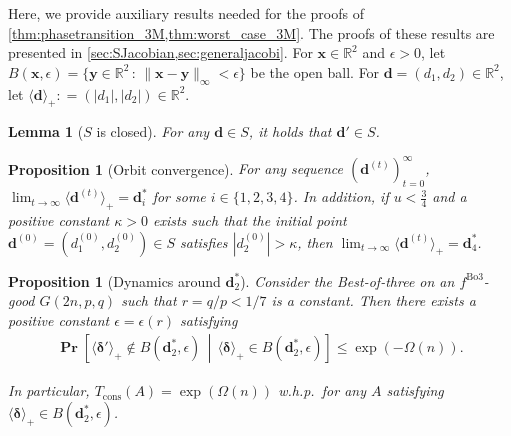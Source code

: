 \documentclass[letterpaper,11pt]{article}
\newtheorem{lemma}[theorem]{Lemma}
\newtheorem{proposition}[theorem]{Proposition}
\newcommand{\Tcons}{T_{\mathrm{cons}}}
\newcommand{\Bthree}{\mathrm{Bo3}}
\newcommand*{\absp}[1]{\langle #1 \rangle_+}
\renewcommand\Pr{\mathop{\mathbf{Pr}}}
\def\defeq{\mathrel{\mathop:}=}%
\begin{document}
Here, we provide auxiliary results needed for the proofs of \cref{thm:phasetransition_3M,thm:worst_case_3M}.
The proofs of these results are presented in \cref{sec:SJacobian,sec:generaljacobi}. %
For $\mathbf{x}\in\mathbb{R}^2$ and $\epsilon>0$, let $B(\mathbf{x},\epsilon)=\{\mathbf{y}\in\mathbb{R}^2\,:\,\|\mathbf{x}-\mathbf{y}\|_\infty < \epsilon\}$ be the open ball.
For $\mathbf{d}=(d_1,d_2)\in\mathbb{R}^2$, let $\absp{\mathbf{d}}\defeq (|d_1|,|d_2|) \in \mathbb{R}^2$.
\begin{lemma}[$S$ is closed] \label{lem:3Mvector_field_lem1}
For any $\mathbf{d}\in S$, it holds that $\mathbf{d}'\in S$.
\end{lemma}


\begin{proposition}[Orbit convergence]\label{prop:3Mvectorfield}
For any sequence $(\mathbf{d}^{(t)})_{t=0}^\infty$, $\lim_{t\to\infty} \absp{\mathbf{d}^{(t)}}=\mathbf{d}^*_i$ for some $i\in\{1,2,3,4\}$.
In addition, if $u<\frac{3}{4}$ and a positive constant $\kappa>0$ exists such that the initial point $\mathbf{d}^{(0)}=(d^{(0)}_1,d^{(0)}_2)\in S$ satisfies $|d^{(0)}_2|>\kappa$, then $\lim_{t\to\infty} \absp{\mathbf{d}^{(t)}} =\mathbf{d}^*_4$.
\end{proposition}

\begin{proposition}[Dynamics around $\mathbf{d}^*_2$] \label{prop:sink_3M}
Consider the Best-of-three on an $f^{\Bthree}$-good $G(2n,p,q)$ such that $r=q/p<1/7$ is a constant.
Then there exists a positive constant $\epsilon=\epsilon(r)$ satisfying
\begin{align*}
\Pr\left[\absp{{\boldsymbol \delta'}}\not\in B(\mathbf{d}_2^*,\epsilon) \,\middle|\, \absp{{\boldsymbol \delta}}\in B(\mathbf{d}_2^*,\epsilon)\right] \leq \exp(-\Omega(n)).
\end{align*}

In particular, 
$\Tcons(A) = \exp(\Omega(n))$ w.h.p.~for any $A$ satisfying $\absp{{\boldsymbol \delta}} \in B(\mathbf{d}_2^*,\epsilon)$.
\end{proposition}
\end{document}
